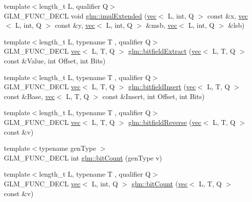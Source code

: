 \begin{DoxyCompactItemize}
\item 
{\footnotesize template$<$length\+\_\+t L, qualifier Q$>$ }\\G\+L\+M\+\_\+\+F\+U\+N\+C\+\_\+\+D\+E\+CL void \hyperlink{group__core__func__integer_gac0c510a70e852f57594a9141848642e3}{glm\+::imul\+Extended} (\hyperlink{structglm_1_1vec}{vec}$<$ L, int, Q $>$ const \&x, \hyperlink{structglm_1_1vec}{vec}$<$ L, int, Q $>$ const \&y, \hyperlink{structglm_1_1vec}{vec}$<$ L, int, Q $>$ \&msb, \hyperlink{structglm_1_1vec}{vec}$<$ L, int, Q $>$ \&lsb)
\item 
{\footnotesize template$<$length\+\_\+t L, typename T , qualifier Q$>$ }\\G\+L\+M\+\_\+\+F\+U\+N\+C\+\_\+\+D\+E\+CL \hyperlink{structglm_1_1vec}{vec}$<$ L, T, Q $>$ \hyperlink{group__core__func__integer_ga346b25ab11e793e91a4a69c8aa6819f2}{glm\+::bitfield\+Extract} (\hyperlink{structglm_1_1vec}{vec}$<$ L, T, Q $>$ const \&Value, int Offset, int Bits)
\item 
{\footnotesize template$<$length\+\_\+t L, typename T , qualifier Q$>$ }\\G\+L\+M\+\_\+\+F\+U\+N\+C\+\_\+\+D\+E\+CL \hyperlink{structglm_1_1vec}{vec}$<$ L, T, Q $>$ \hyperlink{group__core__func__integer_ga2e82992340d421fadb61a473df699b20}{glm\+::bitfield\+Insert} (\hyperlink{structglm_1_1vec}{vec}$<$ L, T, Q $>$ const \&Base, \hyperlink{structglm_1_1vec}{vec}$<$ L, T, Q $>$ const \&Insert, int Offset, int Bits)
\item 
{\footnotesize template$<$length\+\_\+t L, typename T , qualifier Q$>$ }\\G\+L\+M\+\_\+\+F\+U\+N\+C\+\_\+\+D\+E\+CL \hyperlink{structglm_1_1vec}{vec}$<$ L, T, Q $>$ \hyperlink{group__core__func__integer_ga750a1d92464489b7711dee67aa3441b6}{glm\+::bitfield\+Reverse} (\hyperlink{structglm_1_1vec}{vec}$<$ L, T, Q $>$ const \&v)
\item 
{\footnotesize template$<$typename gen\+Type $>$ }\\G\+L\+M\+\_\+\+F\+U\+N\+C\+\_\+\+D\+E\+CL int \hyperlink{group__core__func__integer_ga44abfe3379e11cbd29425a843420d0d6}{glm\+::bit\+Count} (gen\+Type v)
\item 
{\footnotesize template$<$length\+\_\+t L, typename T , qualifier Q$>$ }\\G\+L\+M\+\_\+\+F\+U\+N\+C\+\_\+\+D\+E\+CL \hyperlink{structglm_1_1vec}{vec}$<$ L, int, Q $>$ \hyperlink{group__core__func__integer_gaac7b15e40bdea8d9aa4c4cb34049f7b5}{glm\+::bit\+Count} (\hyperlink{structglm_1_1vec}{vec}$<$ L, T, Q $>$ const \&v)
\item 

\end{DoxyCompactItemize}
